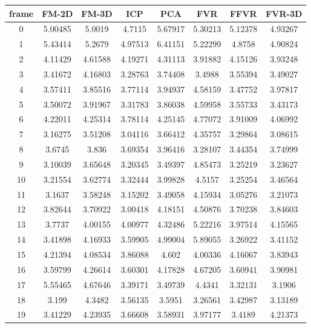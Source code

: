 
\begin{figure}
\centering
\begin{tabular}{cccccccc}
\hline
\textbf{frame} & \textbf{FM-2D} & \textbf{FM-3D} & \textbf{ICP} & \textbf{PCA} & \textbf{FVR} & \textbf{FFVR} & \textbf{FVR-3D}
\\ \hline
0 & 5.00485 & 5.0019 & 4.7115 & 5.67917 & 5.30213 & 5.12378 & 4.93267\\
1 & 5.43414 & 5.2679 & 4.97513 & 6.41151 & 5.22299 & 4.8758 & 4.90824\\
2 & 4.11429 & 4.61588 & 4.19271 & 4.31113 & 3.91882 & 4.15126 & 3.93248\\
3 & 3.41672 & 4.16803 & 3.28763 & 3.74408 & 3.4988 & 3.55394 & 3.49027\\
4 & 3.57411 & 3.85516 & 3.77114 & 3.94937 & 4.58159 & 3.47752 & 3.97817\\
5 & 3.50072 & 3.91967 & 3.31783 & 3.86038 & 4.59958 & 3.55733 & 3.43173\\
6 & 4.22011 & 4.25314 & 3.78114 & 4.25145 & 4.77072 & 3.91009 & 4.06992\\
7 & 3.16275 & 3.51208 & 3.04116 & 3.66412 & 4.35757 & 3.29864 & 3.08615\\
8 & 3.6745 & 3.836 & 3.69354 & 3.96416 & 3.28107 & 3.44354 & 3.74999\\
9 & 3.10039 & 3.65648 & 3.20345 & 3.49397 & 4.85473 & 3.25219 & 3.23627\\
10 & 3.21554 & 3.62774 & 3.32444 & 3.99828 & 4.5157 & 3.25254 & 3.46564\\
11 & 3.1637 & 3.58248 & 3.15202 & 3.49058 & 4.15934 & 3.05276 & 3.21073\\
12 & 3.82644 & 3.70922 & 3.00418 & 4.18151 & 4.50876 & 3.70238 & 3.84603\\
13 & 3.7737 & 4.00155 & 4.00977 & 4.32486 & 5.22216 & 3.97514 & 4.15565\\
14 & 3.41898 & 4.16933 & 3.59905 & 4.99004 & 5.89055 & 3.26922 & 3.41152\\
15 & 4.21394 & 4.08534 & 3.86088 & 4.602 & 4.00336 & 4.16067 & 3.83943\\
16 & 3.59799 & 4.26614 & 3.60301 & 4.17828 & 4.67205 & 3.60941 & 3.90981\\
17 & 5.55465 & 4.67646 & 3.39171 & 3.49739 & 4.4341 & 3.32131 & 3.1906\\
18 & 3.199 & 4.3482 & 3.56135 & 3.5951 & 3.26561 & 3.42987 & 3.13189\\
19 & 3.41229 & 4.23935 & 3.66608 & 3.58931 & 3.97177 & 3.4189 & 4.21373\\

\end{tabular}
\end{figure}
